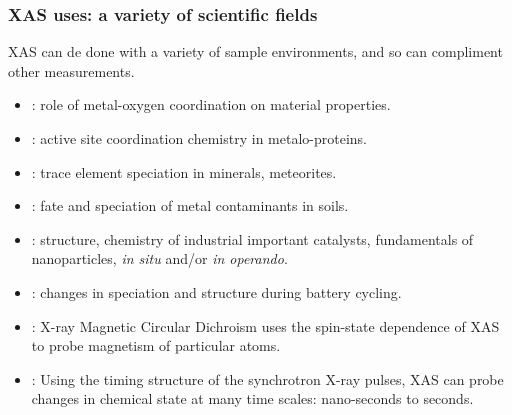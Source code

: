 
\begin{frame}\frametitle{XAS uses: a variety of scientific fields}

XAS can de done with a variety of sample environments, and so can
compliment other measurements.

\vmm
{}

\begin{itemize}
\item {}:   role of  metal-oxygen coordination on material properties.
\item {}:  active site coordination chemistry in metalo-proteins.
\item {}: trace element speciation in minerals,
  meteorites.
\item {}: fate and speciation of metal
  contaminants in soils.
\item {}:  structure, chemistry of
  industrial important catalysts, fundamentals of nanoparticles, {\emph{in
      situ}} and/or {\emph{in operando}}.
\item {}:  changes in speciation and structure
  during battery cycling.
\end{itemize}

\vmm\vmm
{}

\begin{itemize}
\item {}:   X-ray Magnetic Circular Dichroism uses the
  spin-state dependence of XAS to probe magnetism of particular atoms.
\item {}:  Using the timing structure of the synchrotron
  X-ray pulses,  XAS can probe changes in chemical state at many time
  scales: nano-seconds to seconds.
\end{itemize}

\end{frame}
